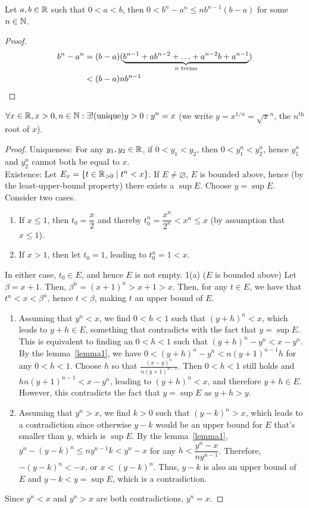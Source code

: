 \begin{lemma}
	\label{lemma1}
	Let $a,b\in\mathbb{R}$ such that $0<a<b$, then $0<b^n-a^n\leq nb^{n-1}(b-a)$ for some $n\in\mathbb{N}$.
	\begin{proof}
		{
			\begin{align*}
				b^n-a^n & =(b-a)(\underbrace{b^{n-1}+ab^{n-2}+\ldots+a^{n-2}b+a^{n-1}}_{\text{$\footnotesize n$ terms}}) \\
				        & <(b-a)nb^{n-1}
			\end{align*}
		}
	\end{proof}
\end{lemma}

\begin{theorem}
	$\forall x \in \mathbb{R}, x>0, n \in \mathbb{N}: \exists !(\text{unique}) y>0: y^{n}=x$ (we write $y=x^{1/n}=\sqrt{x}^{n}$, the $n^{\text{th}}$ root of $x$).
	\begin{proof}
		Uniqueness: For any $y_1,y_2\in\mathbb{R}$, if $0<y_1<y_2$, then $0<y_1^n<y_2^n$, hence $y_1^n$ and $y_2^n$ cannot both be equal to $x$.\\
		Existence: Let $E_x=\{{t\in\mathbb{R}_{>0}\mid t^n<x}\}$.
		If $E\neq \varnothing$, $E$ is bounded above, hence (by the least-upper-bound property) there exists a $\sup E$. Choose $y=\sup E$. Consider two cases.
		\begin{enumerate}
			\item If $x\leq 1$, then $t_0=\dfrac{x}{2}$ and thereby $t_0^n=\dfrac{x^n}{2^n}<x^n\leq x$ (by assumption that $x\leq 1$).
			\item If $x>1$, then let $t_0=1$, leading to $t_0^n=1<x$.
		\end{enumerate}
		In either case, $t_0\in E$, and hence $E$ is not empty.
		1(a) ($E$ is bounded above)
		Let $\beta=x+1$. Then, $\beta^n=(x+1)^n>x+1>x$. Then, for any $t\in E$, we have that $t^n<x<\beta^n$, hence $t<\beta$, making $t$ an upper bound of $E$.
		\begin{enumerate}
			\item
			      Assuming that $y^n< x$, we find $0<h<1$ such that $(y+h)^n<x$, which leads to $y+h\in E$, something that contradicts with the fact that $y=\sup E$. This is equivalent to finding an $0<h<1$ such that $(y+h)^n-y^n<x-y^n$.
			      By the lemma~\ref{lemma1}, we have $0<(y+h)^n-y^n< n(y+1)^{n-1}h$ for any $0<h<1$. Choose $h$ so that $\frac{(x-y)^{n}}{n(y+1)^{n-1}}$.
			      Then $0<h<1$ still holds and $hn(y+1)^{n-1}<x-y^{n}$, leading to $(y+h)^{n}<x$, and therefore $y+h \in E$. However, this contradicts the fact that $y=\sup E$ as $y+h>y$.
			\item Assuming that $y^n> x$, we find $k>0$ such that $(y-k)^n>x$, which leads to a contradiction since otherwise $y-k$ would be an upper bound for $E$ that's smaller than $y$, which is $\sup{E}$.
			      By the lemma~\ref{lemma1}, $y^n-(y-k)^n\leq ny^{n -1}k<y^n-x$ for any $h<\dfrac{y^n-x}{ny^{n-1}}$. Therefore, $-(y-k)^{n}<-x$, or $x<(y-k)^{n}$. Thus, $y-k$ is also an upper bound of $E$ and $y-k<y=\sup{E}$, which is a contradiction.
		\end{enumerate}
		Since $y^{n}<x$ and $y^{n}>x$ are both contradictions, $y^{n}=x$.
	\end{proof}
\end{theorem}

